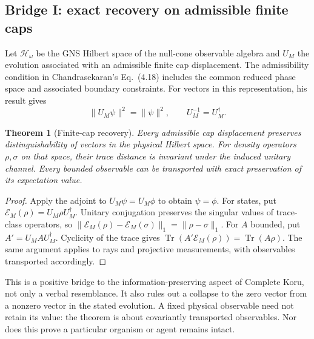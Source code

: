 \documentclass[11pt,a4paper]{article}
\newtheorem{theorem}{Theorem}[section]\newtheorem{proposition}[theorem]{Proposition}\newtheorem{definition}[theorem]{Definition}\newtheorem{example}[theorem]{Example}
\begin{document}
\subsection{Bridge I: exact recovery on admissible finite caps}
Let $\mathcal H_\omega$ be the GNS Hilbert space of the null-cone observable algebra and $U_M$ the evolution associated with an admissible finite cap displacement. The admissibility condition in Chandrasekaran's Eq.~(4.18) includes the common reduced phase space and associated boundary constraints. For vectors in this representation, his result gives
\begin{equation}\|U_M\psi\|^2=\|\psi\|^2,\qquad U_M^{-1}=U_M^\dagger.\end{equation}
\begin{theorem}[Finite-cap recovery]\label{thm:cap}
Every admissible cap displacement preserves distinguishability of vectors in the physical Hilbert space. For density operators $\rho,\sigma$ on that space, their trace distance is invariant under the induced unitary channel. Every bounded observable can be transported with exact preservation of its expectation value.
\end{theorem}
\begin{proof}
Apply the adjoint to $U_M\psi=U_M\phi$ to obtain $\psi=\phi$. For states, put $\mathcal E_M(\rho)=U_M\rho U_M^\dagger$. Unitary conjugation preserves the singular values of trace-class operators, so $\|\mathcal E_M(\rho)-\mathcal E_M(\sigma)\|_1=\|\rho-\sigma\|_1$. For $A$ bounded, put $A'=U_M A U_M^\dagger$. Cyclicity of the trace gives $\operatorname{Tr}(A'\mathcal E_M(\rho))=\operatorname{Tr}(A\rho)$. The same argument applies to rays and projective measurements, with observables transported accordingly.
\end{proof}
This is a positive bridge to the information-preserving aspect of Complete Koru, not only a verbal resemblance. It also rules out a collapse to the zero vector from a nonzero vector in the stated evolution. A fixed physical observable need not retain its value: the theorem is about covariantly transported observables. Nor does this prove a particular organism or agent remains intact.
\end{document}
